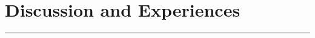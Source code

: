 \documentclass[11pt,a4wide]{article}
\begin{document}

\section{Discussion and Experiences}






\noindent\rule{\textwidth}{1pt}
\end{document}
